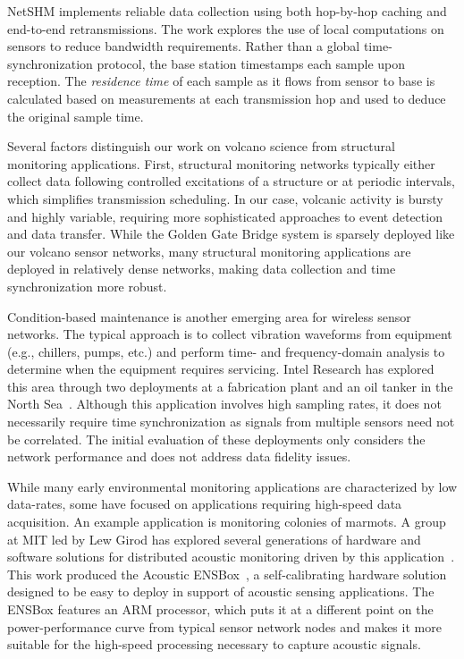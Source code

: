 NetSHM implements reliable data collection using both hop-by-hop caching and
end-to-end retransmissions. The work explores the use of local computations
on sensors to reduce bandwidth requirements. Rather than a global
time-synchronization protocol, the base station timestamps each sample upon
reception. The \textit{residence time} of each sample as it flows from sensor
to base is calculated based on measurements at each transmission hop and used
to deduce the original sample time.

Several factors distinguish our work on volcano science from structural
monitoring applications. First, structural monitoring networks typically
either collect data following controlled excitations of a structure or at
periodic intervals, which simplifies transmission scheduling. In our case,
volcanic activity is bursty and highly variable, requiring more sophisticated
approaches to event detection and data transfer. While the Golden Gate Bridge
system is sparsely deployed like our volcano sensor networks, many structural
monitoring applications are deployed in relatively dense networks, making
data collection and time synchronization more robust. 

Condition-based maintenance is another emerging area for wireless sensor
networks. The typical approach is to collect vibration waveforms from
equipment (e.g., chillers, pumps, etc.) and perform time- and
frequency-domain analysis to determine when the equipment requires servicing.
Intel Research has explored this area through two deployments at a
fabrication plant and an oil tanker in the North
Sea~\cite{intel-northseasensys}. Although this application involves high
sampling rates, it does not necessarily require time synchronization as
signals from multiple sensors need not be correlated. The initial evaluation
of these deployments only considers the network performance and does not
address data fidelity issues.

While many early environmental monitoring applications are characterized by
low data-rates, some have focused on applications requiring high-speed data
acquisition. An example application is monitoring colonies of marmots. A
group at MIT led by Lew Girod has explored several generations of hardware
and software solutions for distributed acoustic monitoring driven by this
application~\cite{girod-marmots}. This work produced the Acoustic
ENSBox~\cite{girod-ensbox}, a self-calibrating hardware solution designed to
be easy to deploy in support of acoustic sensing applications. The ENSBox
features an ARM processor, which puts it at a different point on the
power-performance curve from typical sensor network nodes and makes it more
suitable for the high-speed processing necessary to capture acoustic signals.


